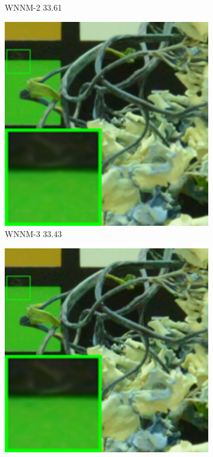 \begin{figure}
\begin{subfigure}[t]{0.19\textwidth}
		\caption{WNNM-2 33.61}
    \end{subfigure}
    \hfill
    \begin{subfigure}[t]{0.19\textwidth}
        \centering
        \includegraphics[width=1\textwidth]{images/mcwnnm/cc/resize_br_WNNM_ADMM_NL_CC15_d800_iso6400_2.png}
		\caption{WNNM-3 33.43}
    \end{subfigure}
    \hfill
    \begin{subfigure}[t]{0.19\textwidth}
        \centering
        \includegraphics[width=1\textwidth]{images/mcwnnm/cc/resize_br_CWNNM_ADMM_NL_CC15_d800_iso6400_2.png}

\end{subfigure}
\end{figure}
